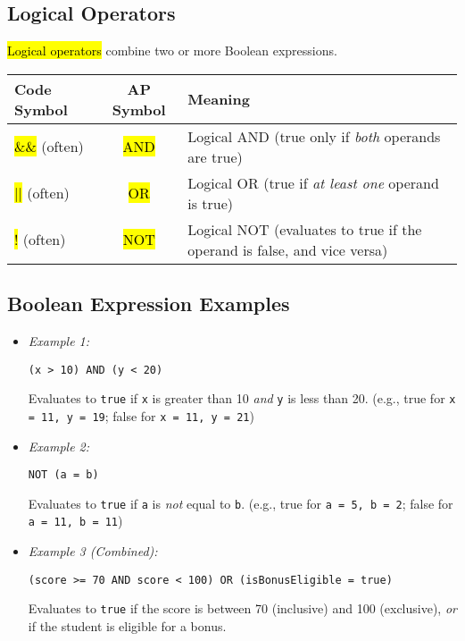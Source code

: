 \documentclass[11pt,oneside]{book}
\newcommand{\hlc}[2][hlyellow]{\sethlcolor{#1}\hl{#2}}
\begin{document}
\subsection*{Logical Operators}
\hlc[hlred]{Logical operators} combine two or more Boolean expressions.

\begin{tabularx}{\textwidth}{>{\ttfamily}l >{\ttfamily}c X}
\toprule
\textbf{Code Symbol} & \textbf{AP Symbol} & \textbf{Meaning} \\
\midrule
\hlc[hlred]{\&\&} (often) & \hlc[hlred]{AND} & Logical AND (true only if \textit{both} operands are true) \\
\hlc[hlred]{||} (often) & \hlc[hlred]{OR} & Logical OR (true if \textit{at least one} operand is true) \\
\hlc[hlred]{!} (often) & \hlc[hlred]{NOT} & Logical NOT (evaluates to true if the operand is false, and vice versa) \\
\bottomrule
\end{tabularx}

\subsection*{Boolean Expression Examples}
\begin{itemize}
\item \textit{Example 1:}
\begin{lstlisting}[language={}, basicstyle=\ttfamily\small]
(x > 10) AND (y < 20)
\end{lstlisting}
Evaluates to \texttt{true} if \texttt{x} is greater than 10 \textit{and} \texttt{y} is less than 20. (e.g., true for \texttt{x = 11, y = 19}; false for \texttt{x = 11, y = 21})
\item \textit{Example 2:}
\begin{lstlisting}[language={}, basicstyle=\ttfamily\small]
NOT (a = b)
\end{lstlisting}
Evaluates to \texttt{true} if \texttt{a} is \textit{not} equal to \texttt{b}. (e.g., true for \texttt{a = 5, b = 2}; false for \texttt{a = 11, b = 11})
\item \textit{Example 3 (Combined):}
\begin{lstlisting}[language={}, basicstyle=\ttfamily\small]
(score >= 70 AND score < 100) OR (isBonusEligible = true)
\end{lstlisting}
Evaluates to \texttt{true} if the score is between 70 (inclusive) and 100 (exclusive), \textit{or} if the student is eligible for a bonus.
\end{itemize}
\end{document}
